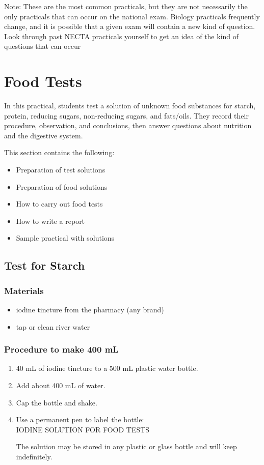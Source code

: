 Note: These are the most common practicals, but they are not necessarily the only practicals that can occur on the national exam. Biology practicals frequently change, and it is possible that a given exam will contain a new kind of question. Look through past NECTA practicals yourself to get an idea of the kind of questions that can occur

\section{Food Tests}

In this practical, students test a solution of unknown food substances for starch, protein, reducing sugars, non-reducing sugars, and fats/oils. They record their procedure, observation, and conclusions, then answer questions about nutrition and the digestive system.

This section contains the following:
\begin{itemize}
\item{Preparation of test solutions}
\item{Preparation of food solutions}
\item{How to carry out food tests}
\item{How to write a report}
\item{Sample practical with solutions}
\end{itemize}

\subsection{Test for Starch}

\subsubsection{Materials}
\begin{itemize}
\item{iodine tincture from the pharmacy (any brand)}
\item{tap or clean river water}
\end{itemize}

\subsubsection{Procedure to make 400 mL}
\begin{enumerate}
\item{40 mL of iodine tincture to a 500 mL plastic water bottle.}
\item{Add about 400 mL of water.}
\item{Cap the bottle and shake.}
\item{Use a permanent pen to label the bottle:\\
IODINE SOLUTION FOR FOOD TESTS}

The solution may be stored in any plastic or glass bottle and will keep indefinitely.
\end{enumerate}

